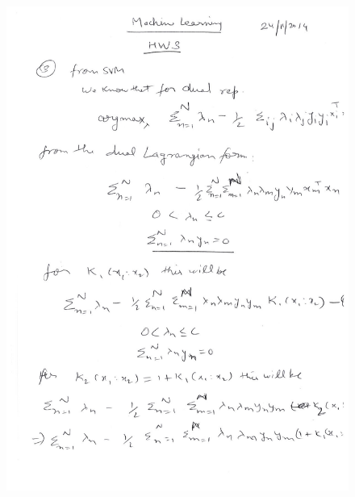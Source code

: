 \documentclass[11pt]{article}
\begin{document}
\begin{figure}[H]
	\centering
	\includegraphics[page=1,scale=0.65]{scans}
\end{figure}
\end{document}
